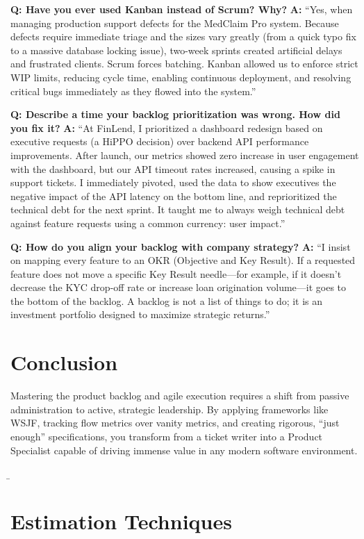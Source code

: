 \documentclass[
  11pt,
  openany,
  oneside]{book}
\begin{document}
\textbf{Q: Have you ever used Kanban instead of Scrum? Why?} \textbf{A:}
``Yes, when managing production support defects for the MedClaim Pro
system. Because defects require immediate triage and the sizes vary
greatly (from a quick typo fix to a massive database locking issue),
two-week sprints created artificial delays and frustrated clients. Scrum
forces batching. Kanban allowed us to enforce strict WIP limits,
reducing cycle time, enabling continuous deployment, and resolving
critical bugs immediately as they flowed into the system.''

\textbf{Q: Describe a time your backlog prioritization was wrong. How
did you fix it?} \textbf{A:} ``At FinLend, I prioritized a dashboard
redesign based on executive requests (a HiPPO decision) over backend API
performance improvements. After launch, our metrics showed zero increase
in user engagement with the dashboard, but our API timeout rates
increased, causing a spike in support tickets. I immediately pivoted,
used the data to show executives the negative impact of the API latency
on the bottom line, and reprioritized the technical debt for the next
sprint. It taught me to always weigh technical debt against feature
requests using a common currency: user impact.''

\textbf{Q: How do you align your backlog with company strategy?}
\textbf{A:} ``I insist on mapping every feature to an OKR (Objective and
Key Result). If a requested feature does not move a specific Key Result
needle---for example, if it doesn't decrease the KYC drop-off rate or
increase loan origination volume---it goes to the bottom of the backlog.
A backlog is not a list of things to do; it is an investment portfolio
designed to maximize strategic returns.''

\section{Conclusion}\label{conclusion-4}

Mastering the product backlog and agile execution requires a shift from
passive administration to active, strategic leadership. By applying
frameworks like WSJF, tracking flow metrics over vanity metrics, and
creating rigorous, ``just enough'' specifications, you transform from a
ticket writer into a Product Specialist capable of driving immense value
in any modern software environment.

\b

\section{Estimation Techniques}\label{estimation-techniques}
\end{document}
